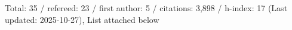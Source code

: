 Total: 35 / refereed: 23 / first author: 5 / citations: 3,898 / h-index: 17 (Last updated: 2025-10-27), List attached below